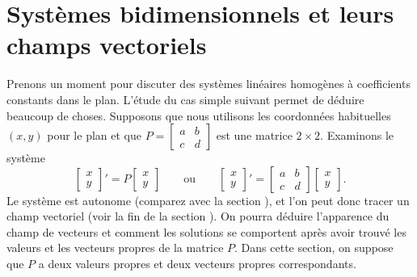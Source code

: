 
\sectionnewpage
\section{Systèmes bidimensionnels et leurs champs vectoriels}
\label{sec:twodimaut}


Prenons un moment pour discuter des systèmes linéaires homogènes à coefficients constants dans le plan. L'étude du cas simple suivant permet de déduire beaucoup de choses. Supposons que nous utilisons les coordonnées habituelles $(x,y)$ pour le plan et que
$P = \left[ \begin{smallmatrix} a & b \\ c & d \end{smallmatrix} \right]$ 
est une matrice $2 \times 2$. Examinons le système
\begin{equation} \label{pln:eq}
\begin{bmatrix} x \\ y \end{bmatrix} ' =
P \begin{bmatrix} x \\ y \end{bmatrix} 
\qquad 
\text{ou}
\qquad
\begin{bmatrix} x \\ y \end{bmatrix} ' =
\begin{bmatrix} a & b \\ c & d \end{bmatrix} 
\begin{bmatrix} x \\ y \end{bmatrix} 
.
\end{equation}
Le système est autonome (comparez avec la section ),
et l'on peut donc tracer un champ vectoriel (voir la fin de la section
).
On pourra déduire l'apparence du champ de vecteurs et comment les solutions se comportent après avoir trouvé les valeurs et les vecteurs propres de la matrice $P$.
Dans cette section, on suppose que $P$ a deux valeurs propres et deux vecteurs propres correspondants.

\medskip

